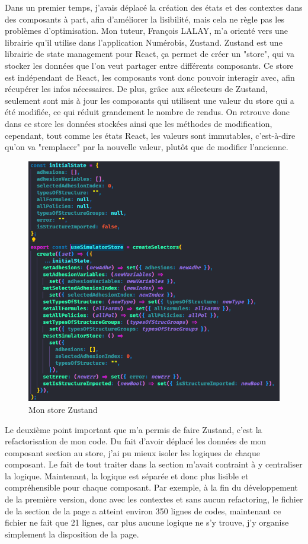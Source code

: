 \documentclass[a4paper,12pt]{report}
\begin{document}
Dans un premier temps, j'avais déplacé la création des états et des contextes dans des composants à part, afin d'améliorer la lisibilité, mais cela ne règle pas les problèmes d'optimisation. Mon tuteur, François LALAY, m'a orienté vers une librairie qu'il utilise dans l'application Numérobis, Zustand. Zustand est une librairie de state management pour React, ça permet de créer un "store", qui va stocker les données que l'on veut partager entre différents composants. Ce store est indépendant de React, les composants vont donc pouvoir interagir avec, afin récupérer les infos nécessaires. De plus, grâce aux sélecteurs de Zustand, seulement sont mis à jour les composants qui utilisent une valeur du store qui a été modifiée, ce qui réduit grandement le nombre de rendus. On retrouve donc dans ce store les données stockées ainsi que les méthodes de modification, cependant, tout comme les états React, les valeurs sont immutables, c'est-à-dire qu'on va "remplacer" par la nouvelle valeur, plutôt que de modifier l'ancienne.

\begin{figure}[H]
    \centering
    \includegraphics[scale=0.4]{storeZustand.png}
    \caption{Mon store Zustand}
    \label{fig:store-zustand}
\end{figure}

Le deuxième point important que m'a permis de faire Zustand, c'est la refactorisation de mon code. Du fait d'avoir déplacé les données de mon composant section au store, j'ai pu mieux isoler les logiques de chaque composant. Le fait de tout traiter dans la section m'avait contraint à y centraliser la logique. Maintenant, la logique est séparée et donc plus lisible et compréhensible pour chaque composant. Par exemple, à la fin du développement de la première version, donc avec les contextes et sans aucun refactoring, le fichier de la section de la page a atteint environ 350 lignes de codes, maintenant ce fichier ne fait que 21 lignes, car plus aucune logique ne s'y trouve, j'y organise simplement la disposition de la page.
\end{document}
